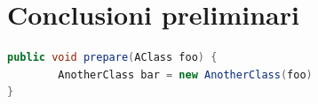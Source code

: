 \newpage
\section{Conclusioni preliminari}
\label{sec:ConclusioniTecnologie}

\newpage


\begin{lstlisting}[language=Java, label=lst:java, caption={Some code in another language than the default one}]
public void prepare(AClass foo) {
        AnotherClass bar = new AnotherClass(foo)
}
\end{lstlisting}
